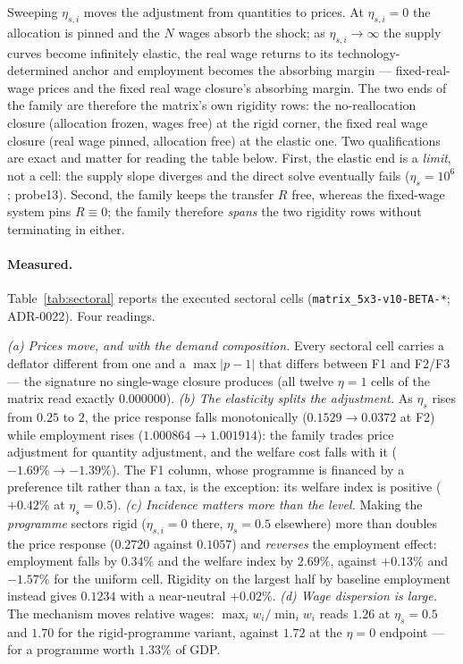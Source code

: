 \begin{remark}
Sweeping $\eta_{s,i}$ moves the adjustment from quantities to prices. At
$\eta_{s,i} = 0$ the allocation is pinned and the $N$ wages absorb the shock;
as $\eta_{s,i} \to \infty$ the supply curves become infinitely elastic, the
real wage returns to its technology-determined anchor and employment becomes
the absorbing margin --- fixed-real-wage prices and the fixed real wage
closure's absorbing margin. The
two ends of the family are therefore the matrix's own rigidity rows: the
no-reallocation closure
(allocation frozen, wages free) at the rigid corner, the fixed real wage
closure (real wage pinned,
allocation free) at the elastic one. Two qualifications are exact and matter
for reading the table below. First, the elastic end is a \emph{limit}, not a
cell: the supply slope diverges and the direct solve eventually fails
($\eta_s = 10^6$; probe13). Second, the family keeps the transfer $R$ free,
whereas the fixed-wage system pins $R \equiv 0$; the family therefore
\emph{spans} the two rigidity rows without terminating in either.
\end{remark}

\paragraph{Measured.} Table~\ref{tab:sectoral} reports the executed sectoral cells
(\texttt{matrix\_5x3-v10-BETA-*}; ADR-0022). Four readings.

\emph{(a) Prices move, and with the demand composition.} Every sectoral cell
carries a deflator different from one and a $\max|p-1|$ that differs between F1
and F2/F3 --- the signature no single-wage closure produces (all twelve
$\eta = 1$ cells of the matrix read exactly $0.000000$).
\emph{(b) The elasticity splits the adjustment.} As $\eta_s$ rises from $0.25$
to $2$, the price response falls monotonically ($0.1529 \to 0.0372$ at F2)
while employment rises ($1.000864 \to 1.001914$): the family trades price
adjustment for quantity adjustment, and the welfare cost falls with it
($-1.69\% \to -1.39\%$). The F1 column, whose programme is financed by a
preference tilt rather than a tax, is the exception: its welfare index is
positive ($+0.42\%$ at $\eta_s = 0.5$).
\emph{(c) Incidence matters more than the level.} Making the \emph{programme}
sectors rigid ($\eta_{s,i} = 0$ there, $\eta_s = 0.5$ elsewhere) more than
doubles the price response ($0.2720$ against $0.1057$) and \emph{reverses} the
employment effect: employment falls by $0.34\%$ and the welfare index by
$2.69\%$, against $+0.13\%$ and $-1.57\%$ for the uniform cell. Rigidity on the
largest half by baseline employment instead gives $0.1234$ with a near-neutral
$+0.02\%$.
\emph{(d) Wage dispersion is large.} The mechanism moves relative wages:
$\max_i w_i / \min_i w_i$ reads $1.26$ at $\eta_s = 0.5$ and $1.70$ for the
rigid-programme variant, against $1.72$ at the $\eta = 0$ endpoint --- for a
programme worth $1.33\%$ of GDP.


